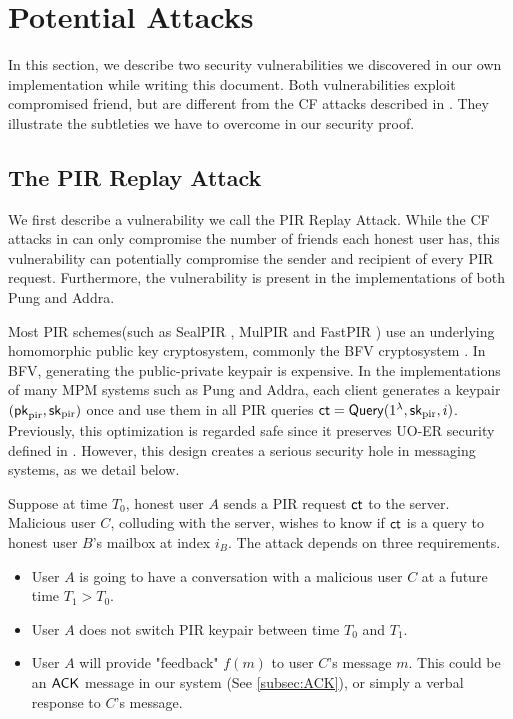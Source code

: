 \section{Potential Attacks}
\label{sec:security-vulnerable}

In this section, we describe two security vulnerabilities we discovered in our own implementation while writing this document. Both vulnerabilities exploit compromised friend, but are different from the CF attacks described in \cite{angel2018cf}. They illustrate the subtleties we have to overcome in our security proof.

\subsection{The PIR Replay Attack}
We first describe a vulnerability we call the PIR Replay Attack. While the CF attacks in \cite{angel2018cf} can only compromise the number of friends each honest user has, this vulnerability can potentially compromise the sender and recipient of every PIR request. Furthermore, the vulnerability is present in the implementations of both Pung and Addra.

Most PIR schemes(such as SealPIR \cite{angel2018pir}, MulPIR \cite{ali2021communicationcomputation} and FastPIR \cite{ahmad2021addra}) use an underlying homomorphic public key cryptosystem, commonly the BFV cryptosystem \cite{fan2012somewhat}. In BFV, generating the public-private keypair is expensive. In the implementations of many MPM systems such as Pung and Addra, each client generates a keypair $(\mathsf{pk}_{\text{pir}}, {\mathsf{sk}}_{\text{pir}})$ once and use them in all PIR queries $\mathsf{ct} = \mathsf{Query}(1^{\lambda}, {\mathsf{sk}}_{\text{pir}}, i)$. Previously, this optimization is regarded safe since it preserves UO-ER security defined in \cite[Extended Version]{angel2016unobservable}. However, this design creates a serious security hole in messaging systems, as we detail below.

Suppose at time $T_0$, honest user $A$ sends a PIR request $\mathsf{ct}$ to the server. Malicious user $C$, colluding with the server, wishes to know if $\mathsf{ct}$ is a query to honest user $B$'s mailbox at index $i_B$. The attack depends on three requirements.
\begin{itemize}
    \item User $A$ is going to have a conversation with a malicious user $C$ at a future time $T_1 > T_0$. 
    \item User $A$ does not switch PIR keypair between time $T_0$ and $T_1$.
    \item User $A$ will provide "feedback" $f(m)$ to user $C$'s message $m$. This could be an $\mathsf{ACK}$ message in our system (See \cref{subsec:ACK}), or simply a verbal response to $C$'s message.  
\end{itemize}

